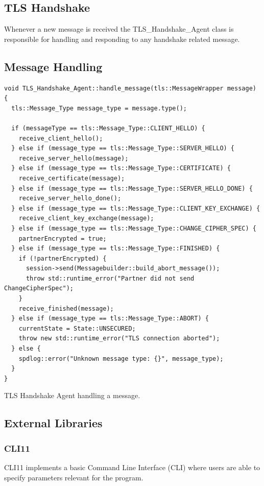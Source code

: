 \documentclass[12pt, letterpaper]{article}
\newenvironment{code}{\captionsetup{type=listing}}{}
\begin{document}
\pagebreak

\subsection{TLS Handshake}
Whenever a new message is received the TLS\_Handshake\_Agent class is responsible for handling and responding to any handshake related message.

\subsection{Message Handling}

\begin{code}
	\begin{verbatim}
void TLS_Handshake_Agent::handle_message(tls::MessageWrapper message) {    
  tls::Message_Type message_type = message.type();

  if (messageType == tls::Message_Type::CLIENT_HELLO) {
    receive_client_hello();
  } else if (message_type == tls::Message_Type::SERVER_HELLO) {
    receive_server_hello(message);
  } else if (message_type == tls::Message_Type::CERTIFICATE) {
    receive_certificate(message);
  } else if (message_type == tls::Message_Type::SERVER_HELLO_DONE) {
    receive_server_hello_done();
  } else if (message_type == tls::Message_Type::CLIENT_KEY_EXCHANGE) {
    receive_client_key_exchange(message);
  } else if (message_type == tls::Message_Type::CHANGE_CIPHER_SPEC) {
    partnerEncrypted = true;
  } else if (message_type == tls::Message_Type::FINISHED) {
    if (!partnerEncrypted) {
      session->send(Messagebuilder::build_abort_message());
      throw std::runtime_error("Partner did not send ChangeCipherSpec");
    }
    receive_finished(message);
  } else if (message_type == tls::Message_Type::ABORT) {
    currentState = State::UNSECURED;
    throw new std::runtime_error("TLS connection aborted");
  } else {
    spdlog::error("Unknown message type: {}", message_type);
  }
}
	\end{verbatim}
	\caption{TLS Handshake Agent handling a message.}
	\label{messageHandling}
\end{code}

\pagebreak

\subsection{External Libraries}
\label{extBib}

\subsubsection{CLI11}
CLI11 \cite{cli11_ref} implements a basic Command Line Interface (CLI) where users are able to specify parameters relevant for the program. 
\end{document}
